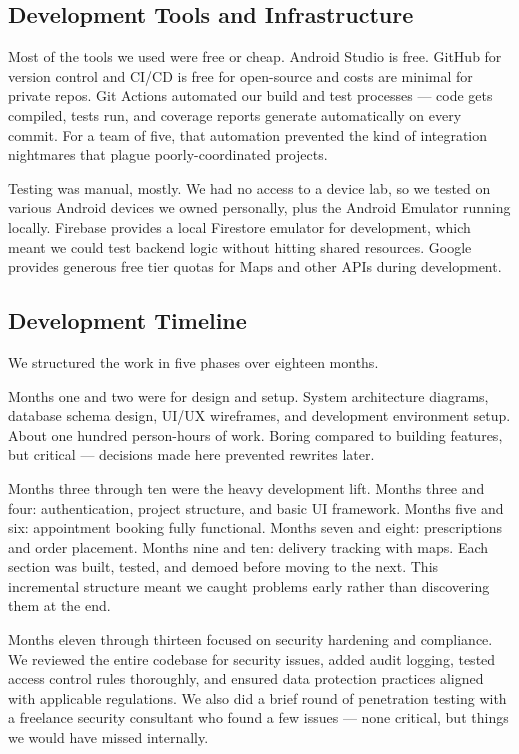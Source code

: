 \documentclass[12pt,a4paper]{report}
\begin{document}
\begin{itemize}
\subsection{Development Tools and Infrastructure}

Most of the tools we used were free or cheap. Android Studio is free. GitHub for version control and CI/CD is free for open-source and costs are minimal for private repos. Git Actions automated our build and test processes — code gets compiled, tests run, and coverage reports generate automatically on every commit. For a team of five, that automation prevented the kind of integration nightmares that plague poorly-coordinated projects.

Testing was manual, mostly. We had no access to a device lab, so we tested on various Android devices we owned personally, plus the Android Emulator running locally. Firebase provides a local Firestore emulator for development, which meant we could test backend logic without hitting shared resources. Google provides generous free tier quotas for Maps and other APIs during development.

\subsection{Development Timeline}

We structured the work in five phases over eighteen months.

Months one and two were for design and setup. System architecture diagrams, database schema design, UI/UX wireframes, and development environment setup. About one hundred person-hours of work. Boring compared to building features, but critical — decisions made here prevented rewrites later.

Months three through ten were the heavy development lift. Months three and four: authentication, project structure, and basic UI framework. Months five and six: appointment booking fully functional. Months seven and eight: prescriptions and order placement. Months nine and ten: delivery tracking with maps. Each section was built, tested, and demoed before moving to the next. This incremental structure meant we caught problems early rather than discovering them at the end.

Months eleven through thirteen focused on security hardening and compliance. We reviewed the entire codebase for security issues, added audit logging, tested access control rules thoroughly, and ensured data protection practices aligned with applicable regulations. We also did a brief round of penetration testing with a freelance security consultant who found a few issues — none critical, but things we would have missed internally.


\end{itemize}
\end{document}
